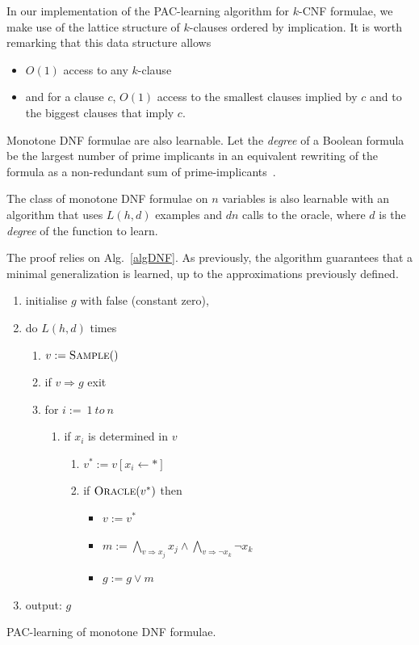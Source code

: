 \documentclass{llncs}
\begin{document}
In our implementation of the PAC-learning algorithm for $k$-CNF formulae,
we make use of the lattice structure of $k$-clauses ordered by implication.
It is worth remarking that this data structure allows
\begin{itemize}
	\item $O(1)$ access to any $k$-clause
	\item and for a clause $c$, $O(1)$ access to the smallest clauses implied by $c$ and to the biggest clauses that imply $c$.
\end{itemize}

Monotone DNF formulae are also learnable.
Let the \emph{degree} of a Boolean formula be the largest number of prime
implicants in an equivalent rewriting of the formula as a non-redundant sum of
prime-implicants~\cite{Valiant84cacm}.


\begin{theorem}\label{thm:mdnf}
    The class of monotone DNF formulae on $n$ variables is also learnable with an
    algorithm that uses $L(h,d)$ examples and $d n$ calls to the oracle,
    where $d$ is the \emph{degree} of the function to learn.
\end{theorem}

The proof relies on Alg.~\ref{algDNF}. As previously, the algorithm guarantees that a minimal generalization is learned, up to the approximations previously defined.

\begin{algorithm}
\begin{enumerate}
\item initialise $g$ with false (constant zero),
\item
do $L(h,d)$ times 
\begin{enumerate}
\item $v:=\textsc{Sample}()$
	\item 
	if $v\Rightarrow g$ exit
\item for $i:=\ 1\ to \ n$
\begin{enumerate}
\item if $x_i$ is determined in $v$
\begin{enumerate}
\item $v^*:=v[x_i\leftarrow *]$
\item if $\textsc{Oracle}(v^*)$ then 
\begin{itemize}
\item $v:=v^*$
\item $m:=\bigwedge_{v\Rightarrow x_j} x_j\wedge\bigwedge_{v\Rightarrow\neg x_k}\neg x_k$ 
\item $g:=g\vee m$
\end{itemize}
\end{enumerate}
\end{enumerate}
\end{enumerate}
\item output: $g$
\end{enumerate}
\caption{PAC-learning of monotone DNF formulae.\label{algDNF}}
\end{algorithm}
\end{document}
